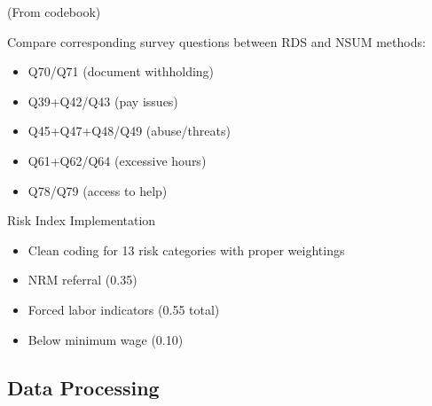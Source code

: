 \documentclass[
  12pt,
  letterpaper,
  DIV=11,
  numbers=noendperiod]{scrartcl}
\providecommand{\tightlist}{%
  \setlength{\itemsep}{0pt}\setlength{\parskip}{0pt}}
\theoremstyle{plain}
\theoremstyle{definition}
\begin{document}
(From codebook)

Compare corresponding survey questions between RDS and NSUM methods:

\begin{itemize}
\tightlist
\item
  Q70/Q71 (document withholding)
\item
  Q39+Q42/Q43 (pay issues)
\item
  Q45+Q47+Q48/Q49 (abuse/threats)
\item
  Q61+Q62/Q64 (excessive hours)
\item
  Q78/Q79 (access to help)
\end{itemize}

Risk Index Implementation

\begin{itemize}
\tightlist
\item
  Clean coding for 13 risk categories with proper weightings
\item
  NRM referral (0.35)
\item
  Forced labor indicators (0.55 total)
\item
  Below minimum wage (0.10)
\end{itemize}

\subsection{Data Processing}\label{app-dataprep}
\end{document}
